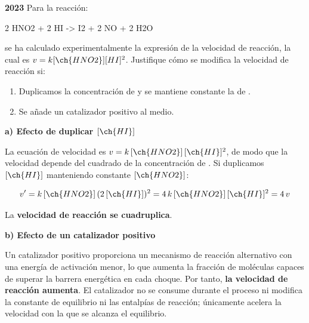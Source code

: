 \begin{exerciseEVAU}
    \textbf{2023} Para la reacción:
    \begin{reaction*}
        2 HNO2 + 2 HI -> I2 + 2 NO + 2 H2O
    \end{reaction*}
    se ha calculado experimentalmente la expresión de la velocidad de reacción, la cual es \( v = k [\ch{HNO2}][HI]^2 \).
    Justifique cómo se modifica la velocidad de reacción si:
    \begin{enumerate}[label=\letraminuscula]
    \item Duplicamos la concentración de  y se mantiene constante la de .
    \item Se añade un catalizador positivo al medio.
    \end{enumerate}

    \begin{solu}

        \textbf{a) Efecto de duplicar \([\ch{HI}]\)}

        La ecuación de velocidad es \(v = k\, [\ch{HNO2}]\, [\ch{HI}]^2\), de modo que la velocidad depende del cuadrado de la concentración de . Si duplicamos \([\ch{HI}]\) manteniendo constante \([\ch{HNO2}]\):

        \begin{equation*}
            v' = k\, [\ch{HNO2}]\, (2\, [\ch{HI}])^2 = 4\, k\, [\ch{HNO2}]\, [\ch{HI}]^2 = 4\, v
        \end{equation*}

        La \textbf{velocidad de reacción se cuadruplica}.

        \textbf{b) Efecto de un catalizador positivo}

        Un catalizador positivo proporciona un mecanismo de reacción alternativo con una energía de activación menor, lo que aumenta la fracción de moléculas capaces de superar la barrera energética en cada choque. Por tanto, \textbf{la velocidad de reacción aumenta}. El catalizador no se consume durante el proceso ni modifica la constante de equilibrio ni las entalpías de reacción; únicamente acelera la velocidad con la que se alcanza el equilibrio.

    \end{solu}
\end{exerciseEVAU}


